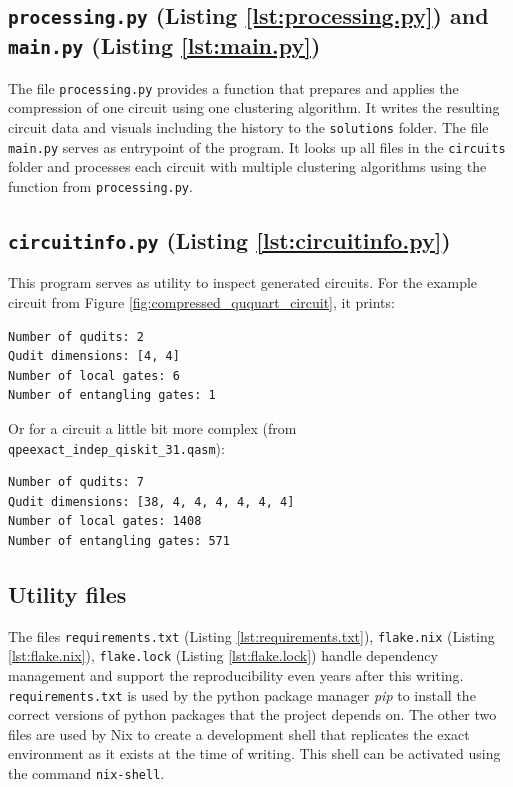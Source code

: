 \subsection*{{\Large\texttt{processing.py}} (Listing \ref{lst:processing.py}) and {\Large\texttt{main.py}} (Listing \ref{lst:main.py})}
  The file \texttt{processing.py} provides a function that prepares and applies the compression of one circuit using one clustering algorithm. It writes the resulting circuit data and visuals including the history to the \texttt{solutions} folder. The file \texttt{main.py} serves as entrypoint of the program. It looks up all files in the \texttt{circuits} folder and processes each circuit with multiple clustering algorithms using the function from \texttt{processing.py}.
\subsection*{{\Large\texttt{circuitinfo.py}} (Listing \ref{lst:circuitinfo.py})}
  This program serves as utility to inspect generated circuits. For the example circuit from Figure \ref{fig:compressed_ququart_circuit}, it prints: 
  \begin{verbatim}
Number of qudits: 2
Qudit dimensions: [4, 4]
Number of local gates: 6
Number of entangling gates: 1
  \end{verbatim}
  Or for a circuit a little bit more complex (from \texttt{qpeexact\_indep\_qiskit\_31.qasm}):
  \begin{verbatim}
Number of qudits: 7
Qudit dimensions: [38, 4, 4, 4, 4, 4, 4]
Number of local gates: 1408
Number of entangling gates: 571
  \end{verbatim}
\subsection*{Utility files}
  The files \texttt{requirements.txt} (Listing \ref{lst:requirements.txt}), \texttt{flake.nix} (Listing \ref{lst:flake.nix}), \texttt{flake.lock} (Listing \ref{lst:flake.lock}) handle dependency management and support the reproducibility even years after this writing. \texttt{requirements.txt} is used by the python package manager \textit{pip} to install the correct versions of python packages that the project depends on. The other two files are used by Nix \cite{Nix} to create a development shell that replicates the exact environment as it exists at the time of writing. This shell can be activated using the command \texttt{nix-shell}.
